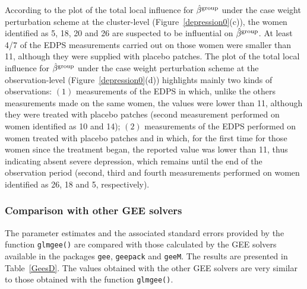 According to the plot of the total local influence for $\hat{\beta}^{\rm group}$ under the case weight perturbation scheme at the cluster-level (Figure~\ref{depression0}(c)), the women identified as 5, 18, 20 and 26 are suspected to be influential on $\hat{\beta}^{\rm group}$. At least 4/7 of the EDPS measurements carried out on those women were smaller than 11, although they were supplied with placebo patches. The plot of the total local influence for $\hat{\beta}^{\rm group}$ under the case weight perturbation scheme at the observation-level (Figure~\ref{depression0}(d)) highlights mainly two kinds of observations: $(1)$ measurements of the EDPS in which, unlike the others measurements made on the same women, the values were lower than 11, although they were treated with placebo patches (second measurement performed on women identified as 10 and 14); $(2)$ measurements of the EDPS performed on women treated with placebo patches and in which, for the first time for those women since the treatment began, the reported value was lower than 11, thus indicating absent severe depression, which remains until the end of the observation period (second, third and fourth measurements performed on women identified as 26, 18 and 5, respectively).

\subsubsection{Comparison with other GEE solvers}
The parameter estimates and the associated standard errors provided by the function {\tt glmgee()} are compared with those calculated by the GEE solvers available in the packages {\tt gee}, {\tt geepack} and {\tt geeM}. The results are presented in Table~\ref{GeesD}. The values obtained with the other GEE solvers are very similar to those obtained with the function {\tt glmgee()}.

